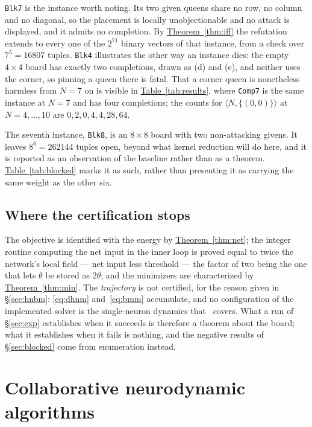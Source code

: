 \documentclass{easychair}
\newcommand{\secref}[1]{\hyperref[#1]{\textcolor{academicpurple}{\S\ref*{#1}}}}
\newcommand{\citeref}[1]{\textcolor{academicpurple}{\cite{#1}}}
\newcommand{\thmref}[1]{\textcolor{academicpurple}{\hyperref[#1]{Theorem~\ref*{#1}}}}
\newcommand{\tabref}[1]{\textcolor{academicpurple}{\hyperref[#1]{Table~\ref*{#1}}}}
\begin{document}
\texttt{Blk7} is the instance worth noting. Its two given queens share no row, no column and no
diagonal, so the placement is locally unobjectionable and no attack is displayed, and it admits no
completion. By \thmref{thm:iff} the refutation extends to every one of the $2^{71}$ binary vectors of
that instance, from a check over $7^5 = 16807$ tuples. \texttt{Blk4} illustrates the other way an
instance dies: the empty $4\times4$ board has exactly two completions, drawn as (d) and (e), and
neither uses the corner, so pinning a queen there is fatal. That a corner queen is nonetheless
harmless from $N = 7$ on is visible in \tabref{tab:results}, where \texttt{Comp7} is the same
instance at $N = 7$ and has four completions; the counts for $\langle N, \{(0,0)\}\rangle$ at
$N = 4,\dots,10$ are $0,2,0,4,4,28,64$.

The seventh instance, \texttt{Blk8}, is an $8\times8$ board with two non-attacking givens. It leaves
$8^6 = 262144$ tuples open, beyond what kernel reduction will do here, and it is reported as an
observation of the baseline rather than as a theorem. \tabref{tab:blocked} marks it as such, rather
than presenting it as carrying the same weight as the other six.

\subsection{Where the certification stops}\label{sec:stop}

The objective is identified with the energy by \thmref{thm:net}; the integer routine computing the
net input in the inner loop is proved equal to twice the network's local field --- net input less
threshold --- the factor of two being the one that lets $\theta$ be stored as $2\theta$; and the
minimizers are characterized by \thmref{thm:min}. The \emph{trajectory} is not certified, for the reason given in
\secref{sec:hnbm}: \eqref{eq:dhnm} and~\eqref{eq:bmm} accumulate, and no configuration of the
implemented solver is the single-neuron dynamics that~\citeref{hnbm} covers. What a run of
\secref{sec:exp} establishes when it succeeds is therefore a theorem about the board; what it
establishes when it fails is nothing, and the negative results of \secref{sec:blocked} come from
enumeration instead.

\section{Collaborative neurodynamic algorithms}\label{sec:cns}
\end{document}
